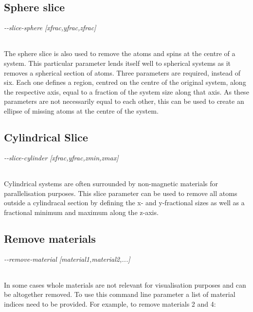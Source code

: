 \subsection*{Sphere slice}

\begin{minipage}[c]{\textwidth}
\centering
\textit{-{}-slice-sphere [xfrac,yfrac,zfrac]}
\end{minipage}\\

The sphere slice is also used to remove the atoms and spins at the centre of a system. This particular parameter lends itself well to spherical systems as it removes a spherical section of atoms. Three parameters are required, instead of six. Each one defines a region, centred on the centre of the original system, along the respective axis, equal to a fraction of the system size along that axis. As these parameters are not necessarily equal to each other, this can be used to create an ellipse of missing atoms at the centre of the system.

\subsection*{Cylindrical Slice}

\begin{minipage}[c]{\textwidth}
\centering
\textit{-{}-slice-cylinder [xfrac,yfrac,zmin,zmax]}
\end{minipage}\\

Cylindrical systems are often surrounded by non-magnetic materials for parallelisation purposes. This slice parameter can be used to remove all atoms outside a cylindracal section by defining the x- and y-fractional sizes as well as a fractional minimum and maximum along the z-axis.

\subsection*{Remove materials}

\begin{minipage}[c]{\textwidth}
\centering
\textit{-{}-remove-material [material1,material2,...]}
\end{minipage}\\

In some cases whole materials are not relevant for visualisation purposes and can be altogether removed. To use this command line parameter a list of material indices need to be provided. For example, to remove materials 2 and 4:

